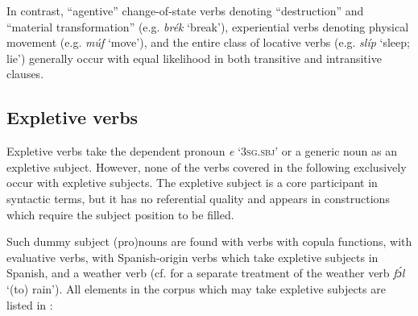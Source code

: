 In contrast, “agentive” change-of-state verbs denoting “destruction” and “material transformation” (e.g. \textit{brék} ‘break’), experiential verbs denoting physical movement (e.g. \textit{múf} ‘move’), and the entire class of locative verbs (e.g. \textit{slíp} ‘sleep; lie’) generally occur with equal likelihood in both transitive and intransitive clauses.


\subsection{Expletive verbs}\label{sec:9.2.4}

Expletive verbs take the dependent pronoun \textit{e} ‘\textsc{3sg.sbj}’ or a generic noun as an expletive subject. However, none of the verbs covered in the following exclusively occur with expletive subjects. The expletive subject is a core participant in syntactic terms, but it has no referential quality and appears in constructions which require the subject position to be filled. 


Such dummy subject (pro)nouns are found with verbs with copula functions, with evaluative verbs, with Spanish-origin verbs which take expletive subjects in Spanish, and a weather verb (cf.  for a separate treatment of the weather verb \textit{fɔ́l} ‘(to) rain’). All elements in the corpus which may take expletive subjects are listed in :


